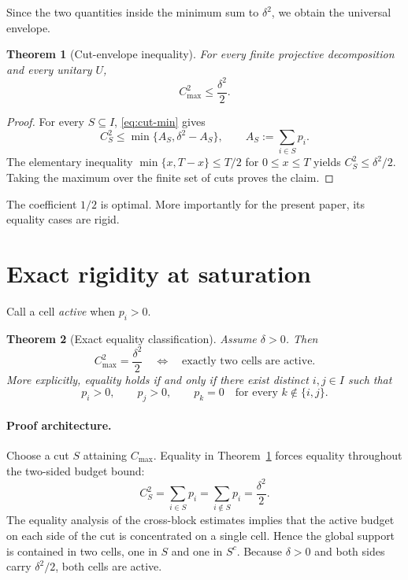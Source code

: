 \documentclass[11pt]{article}
\newtheorem{theorem}{Theorem}[section]
\newcommand{\cmax}{C_{\max}}
\newcommand{\dd}{\delta}
\begin{document}
Since the two quantities inside the minimum sum to $\dd^2$, we obtain the
universal envelope.

\begin{theorem}[Cut-envelope inequality]\label{thm:envelope}
For every finite projective decomposition and every unitary $U$,
\[
  \boxed{\cmax^2\le\frac{\dd^2}{2}}.
\]
\end{theorem}

\begin{proof}
For every $S\subseteq I$, \eqref{eq:cut-min} gives
\[
  C_S^2
  \le
  \min\{A_S,\dd^2-A_S\},
  \qquad
  A_S:=\sum_{i\in S}p_i.
\]
The elementary inequality
$\min\{x,T-x\}\le T/2$ for $0\le x\le T$ yields
$C_S^2\le\dd^2/2$.  Taking the maximum over the finite set of cuts proves the
claim.
\end{proof}

The coefficient $1/2$ is optimal.  More importantly for the present paper,
its equality cases are rigid.

\section{Exact rigidity at saturation}

Call a cell \emph{active} when $p_i>0$.

\begin{theorem}[Exact equality classification]\label{thm:rigidity}
Assume $\dd>0$.  Then
\[
  \boxed{
    \cmax^2=\frac{\dd^2}{2}
    \quad\Longleftrightarrow\quad
    \text{exactly two cells are active}.
  }
\]
More explicitly, equality holds if and only if there exist distinct
$i,j\in I$ such that
\[
  p_i>0,\qquad p_j>0,\qquad
  p_k=0\quad\text{for every }k\notin\{i,j\}.
\]
\end{theorem}

\paragraph{Proof architecture.}
Choose a cut $S$ attaining $\cmax$.  Equality in
Theorem~\ref{thm:envelope} forces equality throughout the two-sided budget
bound:
\[
  C_S^2
  =
  \sum_{i\in S}p_i
  =
  \sum_{i\notin S}p_i
  =
  \frac{\dd^2}{2}.
\]
The equality analysis of the cross-block estimates implies that the active
budget on each side of the cut is concentrated on a single cell.  Hence the
global support is contained in two cells, one in $S$ and one in $S^c$.
Because $\dd>0$ and both sides carry $\dd^2/2$, both cells are active.
\end{document}
